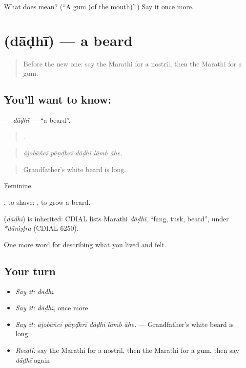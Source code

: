 \begin{tcolorbox}[breakable,colback=teal!4,colframe=teal!35!black,title={Before you move on}]
What does  mean? (\textquotedblleft{}A gum (of the mouth)\textquotedblright{}.) Say it once more.
\end{tcolorbox}
\section[\texorpdfstring{\mr{दाढी} (dāḍhī)}{दाढी (dāḍhī)}]{ (dāḍhī) — a beard}

\label{lesson:MR-C476-dadhi}



\begin{quote}
Before the new one: say the Marathi for a nostril, then the Marathi for a gum.
\end{quote}

\subsection*{You'll want to know: }
\textbf{} — \emph{dāḍhī} — \textquotedblleft{}a beard\textquotedblright{}.

\begin{quote}
    .
\end{quote}

\begin{quote}
\emph{ājobāñcī pāṇḍhrī dāḍhī lāmb āhe.}
\end{quote}

\begin{quote}
Grandfather's white beard is long.
\end{quote}

Feminine.

 , to shave;  , to grow a beard.

\begin{cousinweb}
\textbf{} (\emph{dāḍhī}) is inherited: CDIAL lists Marathi \emph{dāḍhī}, \textquotedblleft{}fang, tusk, beard\textquotedblright{}, under \emph{*dāṁṣṭra} (CDIAL 6250).
\end{cousinweb}

\begin{grammarlens}[title={What you've built}]
One more word for describing what you lived and felt.
\end{grammarlens}

\subsection*{Your turn}
\begin{itemize}
\raggedright
  \item \emph{Say it:} \emph{dāḍhī}
  \item \emph{Say it:} \emph{dāḍhī}, once more
  \item \emph{Say it:} \emph{ājobāñcī pāṇḍhrī dāḍhī lāmb āhe.} — Grandfather's white beard is long.
  \item \emph{Recall:} say the Marathi for a nostril, then the Marathi for a gum, then say \emph{dāḍhī} again
\end{itemize}


